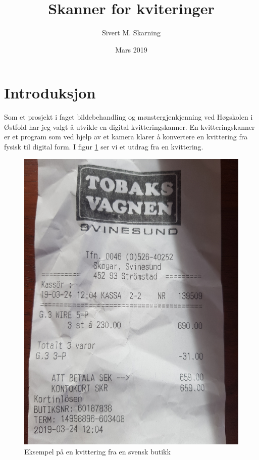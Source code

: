 \documentclass{article}
\title{Skanner for kviteringer}
\author{Sivert M. Skarning}
\date{Mars 2019}
\begin{document}
\maketitle

\section{Introduksjon}
Som et prosjekt i faget bildebehandling og mønstergjenkjenning ved Høgskolen i Østfold har jeg valgt å utvikle en digital kvitteringskanner. En kvitteringskanner er et program som ved hjelp av et kamera klarer å konvertere en kvittering fra fysisk til digital form. I figur \ref{fig:kvittering} ser vi et utdrag fra en kvittering.

\begin{figure}[h]
\centering
\includegraphics[scale=0.05, angle=-90]{images/kvittering.jpg}
\caption{Eksempel på en kvittering fra en svensk butikk}
\label{fig:kvittering}
\end{figure}
\end{document}
